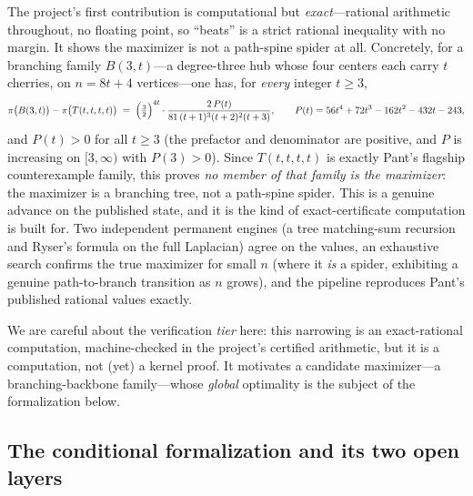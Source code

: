 The project's first contribution is computational but \emph{exact}---rational
arithmetic throughout, no floating point, so ``beats'' is a strict rational
inequality with no margin. It shows the maximizer is not a path-spine spider at all.
Concretely, for a branching family $B(3,t)$---a degree-three hub whose four centers
each carry $t$ cherries, on $n = 8t+4$ vertices---one has, for \emph{every} integer
$t \ge 3$,
\[
  \pi\bigl(B(3,t)\bigr) - \pi\bigl(T(t,t,t,t)\bigr)
  \;=\; \Bigl(\tfrac32\Bigr)^{4t} \cdot
        \frac{2\,P(t)}{81\,(t+1)^3 (t+2)^2 (t+3)},
  \qquad P(t) = 56t^4 + 72t^3 - 162t^2 - 432t - 243,
\]
and $P(t) > 0$ for all $t \ge 3$ (the prefactor and denominator are positive, and
$P$ is increasing on $[3,\infty)$ with $P(3) > 0$). Since $T(t,t,t,t)$ is exactly
Pant's flagship counterexample family, this proves \emph{no member of that family is
the maximizer}: the maximizer is a branching tree, not a path-spine spider. This is
a genuine advance on the published state, and it is the kind of exact-certificate
computation \Telperion{} is built for. Two independent permanent engines (a tree
matching-sum recursion and Ryser's formula on the full Laplacian) agree on the
values, an exhaustive search confirms the true maximizer for small $n$ (where it
\emph{is} a spider, exhibiting a genuine path-to-branch transition as $n$ grows), and
the pipeline reproduces Pant's published rational values exactly.

We are careful about the verification \emph{tier} here: this narrowing is an
exact-rational computation, machine-checked in the project's certified arithmetic,
but it is a computation, not (yet) a \Lean{} kernel proof. It motivates a candidate
maximizer---a branching-backbone family---whose \emph{global} optimality is the
subject of the formalization below.

\subsection{The conditional formalization and its two open layers}

